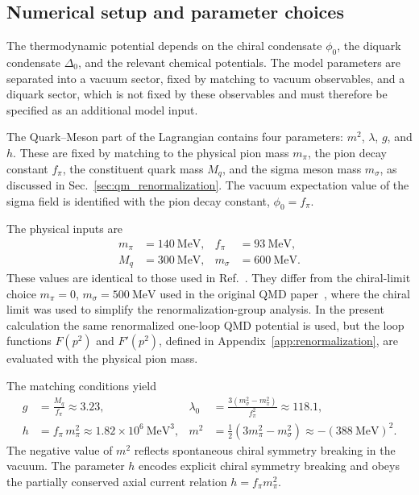 \subsection*{Numerical setup and parameter choices}
\label{subsec:qmd_setup}

The thermodynamic potential depends on the chiral condensate
\(\phi_0\), the diquark condensate \(\Delta_0\), and the relevant
chemical potentials. The model parameters are separated into a vacuum
sector, fixed by matching to vacuum observables, and a diquark sector,
which is not fixed by these observables and must therefore be specified
as an additional model input.

The Quark--Meson part of the Lagrangian contains four parameters:
\(m^2\), \(\lambda\), \(g\), and \(h\). These are fixed by matching to
the physical pion mass \(m_\pi\), the pion decay constant \(f_\pi\),
the constituent quark mass \(M_q\), and the sigma meson mass
\(m_\sigma\), as discussed in
Sec.~\ref{sec:qm_renormalization}. The vacuum expectation value of the
sigma field is identified with the pion decay constant,
\(\phi_0 = f_\pi\).

The physical inputs are
\begin{align}
m_\pi &= 140~\mathrm{MeV}, &
f_\pi &= 93~\mathrm{MeV}, \\
M_q &= 300~\mathrm{MeV}, &
m_\sigma &= 600~\mathrm{MeV}.
\end{align}
These values are identical to those used in Ref.~\cite{Andersen2025}.
They differ from the chiral-limit choice \(m_\pi = 0\),
\(m_\sigma = 500~\mathrm{MeV}\) used in the original QMD
paper~\cite{Andersen2024}, where the chiral limit was used to simplify
the renormalization-group analysis. In the present calculation the same
renormalized one-loop QMD potential is used, but the loop functions
\(F(p^2)\) and \(F'(p^2)\), defined in
Appendix~\ref{app:renormalization}, are evaluated with the physical
pion mass.

The matching conditions yield
\begin{align}
g &= \frac{M_q}{f_\pi} \approx 3.23, &
\lambda_0 &= \frac{3(m_\sigma^2 - m_\pi^2)}{f_\pi^2} \approx 118.1, \\
h &= f_\pi\, m_\pi^2 \approx 1.82\times 10^6~\mathrm{MeV}^3, &
m^2 &= \frac{1}{2}(3m_\pi^2 - m_\sigma^2) \approx -(388~\mathrm{MeV})^2.
\end{align}
The negative value of \(m^2\) reflects spontaneous chiral symmetry
breaking in the vacuum. The parameter \(h\) encodes explicit chiral
symmetry breaking and obeys the partially conserved axial current
relation \(h = f_\pi m_\pi^2\).

